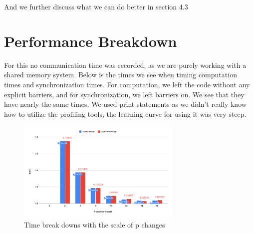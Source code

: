 \documentclass{article}
\begin{document}
And we further discuss what we can do better in section 4.3



\section{Performance Breakdown}
For this no communication time was recorded, as we are purely working with a shared memory system. Below is the times we see when timing computation times and synchronization times. For computation, we left the code without any explicit barriers, and for synchronization, we left barriers on. We see that they have nearly the same times. We used print statements as we didn't really know how to utilize the profiling tools, the learning curve for using it was very steep.

\begin{figure}[H] %
\centering %
\includegraphics[width=0.7\textwidth]{figures/time_break_down.pdf} %
\caption{Time break downs with the scale of p changes} %
\label{Strong Scaling Efficiency VS Num of processors} %
\end{figure}
\end{document}
